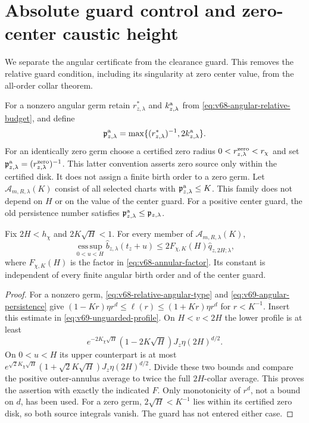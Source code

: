 \section{Absolute guard control and zero-center caustic height}
\label{sec:v69-absolute-guards}
We separate the angular certificate from the clearance guard. This
removes the relative guard condition, including its singularity at
zero center value, from the all-order collar theorem.

For a nonzero angular germ retain $r_{z,\lambda}^*$ and
$k_{z,\lambda}^{\rm a}$ from
\eqref{eq:v68-angular-relative-budget}, and define
\begin{equation}\label{eq:v69-angular-persistence}
 \mathfrak p^{\rm a}_{z,\lambda}
  =\max\{(r_{z,\lambda}^*)^{-1},2k_{z,\lambda}^{\rm a}\}.
\end{equation}
For an identically zero germ choose a certified zero radius
$0<r_{z,\lambda}^{\rm zero}<r_\chi$ and set
$\mathfrak p^{\rm a}_{z,\lambda}=(r_{z,\lambda}^{\rm zero})^{-1}$.
This latter convention asserts zero source only within the certified
disk. It does not assign a finite birth order to a zero germ.
Let $\mathcal A_{m,R,\lambda}(K)$ consist of all selected charts
with $\mathfrak p^{\rm a}_{z,\lambda}\le K$. This family does not
depend on $H$ or on the value of the center guard. For a positive
center guard, the old persistence number satisfies
$\mathfrak p^{\rm a}_{z,\lambda}\le\mathfrak p_{z,\lambda}$.

\begin{lemma}
\label{lem:v69-angular-annulus}
Fix $2H<h_\chi$ and $2K\sqrt H<1$. For every member of
$\mathcal A_{m,R,\lambda}(K)$,
\begin{equation}\label{eq:v69-angular-annulus}
 \operatorname*{ess\,sup}_{0<u<H}
         \widehat b_{z,\lambda}(t_z+u)
          \le2F_{\chi,K}(H)\widehat q_{z,2H;\lambda},
\end{equation}
where $F_{\chi,K}(H)$ is the factor in
\eqref{eq:v68-annular-factor}. Its constant is independent of every
finite angular birth order and of the center guard.
\end{lemma}
\begin{proof}
For a nonzero germ, \eqref{eq:v68-relative-angular-type} and
\eqref{eq:v69-angular-persistence} give
$(1-Kr)\eta r^d\le\ell(r)\le(1+Kr)\eta r^d$ for $r<K^{-1}$.
Insert this estimate in \eqref{eq:v69-unguarded-profile}.
On $H<v<2H$ the lower profile is at least
\[
 e^{-2K_\chi\sqrt H}(1-2K\sqrt H)J_z\eta(2H)^{d/2}.
\]
On $0<u<H$ its upper counterpart is at most
$e^{\sqrt2K_\chi\sqrt H}(1+\sqrt2K\sqrt H)
 J_z\eta(2H)^{d/2}$. Divide these two bounds and compare the
positive outer-annulus average to twice the full $2H$-collar
average. This proves the assertion with exactly the indicated $F$.
Only monotonicity of $r^d$, not a bound on $d$, has been used.
For a zero germ, $2\sqrt H<K^{-1}$ lies within its certified zero
disk, so both source integrals vanish. The guard has not entered
either case.
\end{proof}

